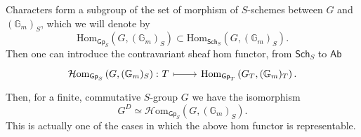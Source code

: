 \documentclass[../Main]{subfiles}
\begin{document}
\begin{rem}
	Characters form a subgroup of the set of morphism of $S$-schemes
	between $G$ and $(\mathbb{G}_m)_S$, which we will denote by
	\begin{equation*}
		\mathrm{Hom}_{\mathsf{Gp}_S} \left( G, (\mathbb{G}_m)_S \right)
		\subset
		\mathrm{Hom}_{\mathsf{Sch}_{ S }} \left( G, (\mathbb{G}_m)_S \right)
	.\end{equation*} 
	Then one can introduce the contravariant sheaf hom functor,
	from $\mathsf{Sch}_{ S }$ to $\mathsf{Ab}$
	\begin{equation*}
	\begin{tikzcd}[row sep = 0ex
		,/tikz/column 1/.append style={anchor=base east}
		,/tikz/column 2/.append style={anchor=base west}]
		\mathcal{H}\mathrm{om}_{\mathsf{Gp}_S} \left( G, (\mathbb{G}_m)_S \right)\colon
		T \arrow[r, "", mapsto] & 
		\mathrm{Hom}_{\mathsf{Gp}_T} \left( G_T, (\mathbb{G}_m)_T \right)
	.\end{tikzcd}
	\end{equation*} 
	Then, for a finite, commutative $S$-group $G$ we have the isomorphism
	\begin{equation*}
		G^D \simeq \mathcal{H}\mathrm{om}_{\mathsf{Gp}_S} \left( G, (\mathbb{G}_m)_S \right)
	.\end{equation*} 
	This is actually one of the cases in which the above hom functor
	is representable.
\end{rem}
\end{document}
